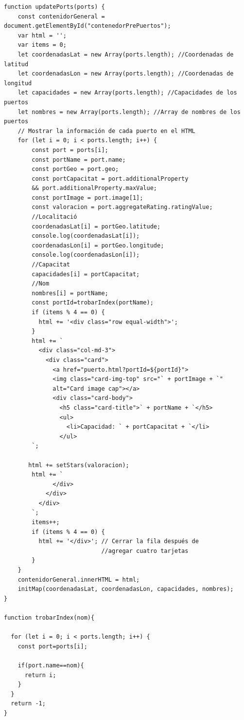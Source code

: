 \documentclass{article}
\begin{document}
\begin{itemize}
    \begin{verbatim}
function updatePorts(ports) {
    const contenidorGeneral = document.getElementById("contenedorPrePuertos");
    var html = '';
    var items = 0;
    let coordenadasLat = new Array(ports.length); //Coordenadas de latitud
    let coordenadasLon = new Array(ports.length); //Coordenadas de longitud
    let capacidades = new Array(ports.length); //Capacidades de los puertos
    let nombres = new Array(ports.length); //Array de nombres de los puertos
    // Mostrar la información de cada puerto en el HTML
    for (let i = 0; i < ports.length; i++) {
        const port = ports[i];
        const portName = port.name;
        const portGeo = port.geo;
        const portCapacitat = port.additionalProperty 
        && port.additionalProperty.maxValue;
        const portImage = port.image[1];
        const valoracion = port.aggregateRating.ratingValue;
        //Localitació
        coordenadasLat[i] = portGeo.latitude;
        console.log(coordenadasLat[i]);
        coordenadasLon[i] = portGeo.longitude;
        console.log(coordenadasLon[i]);
        //Capacitat
        capacidades[i] = portCapacitat;
        //Nom
        nombres[i] = portName;
        const portId=trobarIndex(portName);
        if (items % 4 == 0) {
          html += '<div class="row equal-width">';
        }
        html += `
          <div class="col-md-3">
            <div class="card">
              <a href="puerto.html?portId=${portId}">
              <img class="card-img-top" src="` + portImage + `" 
              alt="Card image cap"></a>
              <div class="card-body">
                <h5 class="card-title">` + portName + `</h5>
                <ul>
                  <li>Capacidad: ` + portCapacitat + `</li>
                </ul>
        `;
   
       html += setStars(valoracion);
        html += `
              </div>
            </div>
          </div>
        `;
        items++;
        if (items % 4 == 0) {
          html += '</div>'; // Cerrar la fila después de 
                            //agregar cuatro tarjetas
        }
    }
    contenidorGeneral.innerHTML = html;
    initMap(coordenadasLat, coordenadasLon, capacidades, nombres);
}

function trobarIndex(nom){

  for (let i = 0; i < ports.length; i++) {
    const port=ports[i];

    if(port.name==nom){
      return i;
    }
  }
  return -1;
}


\end{verbatim}
\end{itemize}
\end{document}
